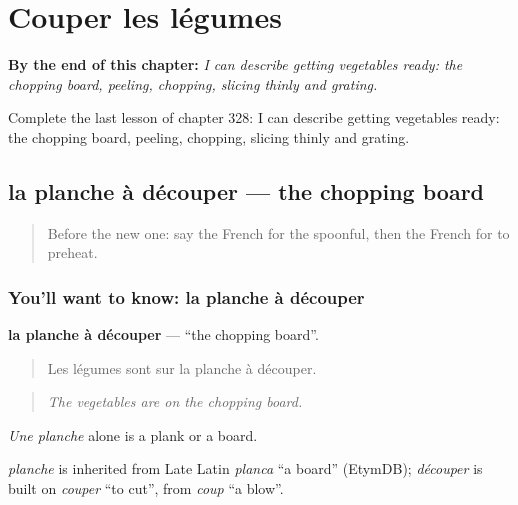 
\chapter{Couper les légumes}
\label{ch:fr-couper-les-legumes}

\begin{chapteropening}
\textbf{By the end of this chapter:} \emph{I can describe getting vegetables ready: the chopping board, peeling, chopping, slicing thinly and grating.}

Complete the last lesson of chapter 328: I can describe getting vegetables ready: the chopping board, peeling, chopping, slicing thinly and grating.
\end{chapteropening}

\section[la planche à découper]{la planche à découper — the chopping board}

\label{lesson:FR-C328-planche-a-decouper}



\begin{quote}
Before the new one: say the French for the spoonful, then the French for to preheat.
\end{quote}

\subsection*{You'll want to know: la planche à découper}
\textbf{la planche à découper} — \textquotedblleft{}the chopping board\textquotedblright{}.

\begin{quote}
Les légumes sont sur la planche à découper.
\end{quote}

\begin{quote}
\emph{The vegetables are on the chopping board.}
\end{quote}

\emph{Une planche} alone is a plank or a board.

\begin{cousinweb}
\emph{planche} is inherited from Late Latin \emph{planca} \textquotedblleft{}a board\textquotedblright{} (EtymDB); \emph{découper} is built on \emph{couper} \textquotedblleft{}to cut\textquotedblright{}, from \emph{coup} \textquotedblleft{}a blow\textquotedblright{}.
\end{cousinweb}

